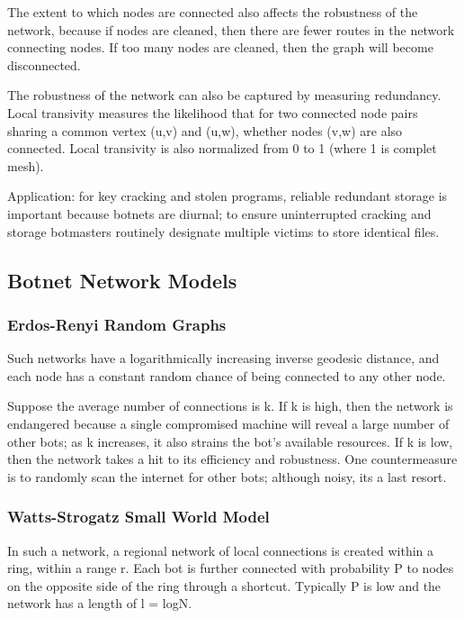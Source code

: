 \documentclass{article}
\begin{document}
The extent to which nodes are connected also affects the robustness of the network, because if nodes are cleaned, then there are fewer routes in the network connecting nodes. If too many nodes are cleaned, then the graph will become disconnected.

The robustness of the network can also be captured by measuring redundancy.  Local transivity measures the likelihood that for two connected node pairs sharing a common vertex (u,v) and (u,w), whether nodes (v,w) are also connected.  Local transivity is also normalized from 0 to 1 (where 1 is complet mesh).

Application: for key cracking and stolen programs, reliable redundant storage is important because botnets are diurnal; to ensure uninterrupted cracking and storage botmasters routinely designate multiple victims to store identical files.

\subsection{Botnet Network Models}

\subsubsection{Erdos-Renyi Random Graphs}

Such networks have a logarithmically increasing inverse geodesic distance, and each node has a constant random chance of being connected to any other node.

Suppose the average number of connections is k.  If k is high, then the network is endangered because a single compromised machine will reveal a large number of other bots; as k increases, it also strains the bot's available resources. If k is low, then the network takes a hit to its efficiency and robustness. One countermeasure is to randomly scan the internet for other bots; although noisy, its a last resort.

\subsubsection{Watts-Strogatz Small World Model}

In such a network, a regional network of local connections is created within a ring, within a range r.  Each bot is further connected with probability P to nodes on the opposite side of the ring through a shortcut.  Typically P is low and the network has a length of l = logN.
\end{document}
